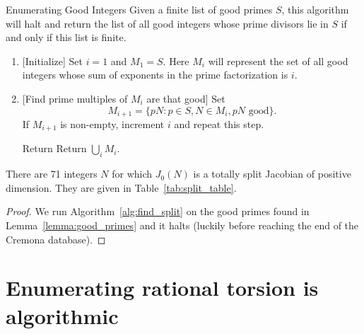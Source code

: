 \documentclass[11pt, proquest]{uwthesis}
\begin{document}
\begin{algorithm}{Enumerating Good Integers}
    \label{alg:find_split}
    Given a finite list of good primes $S$, this algorithm will halt and
    return the list of all good integers whose prime divisors lie in $S$
    if and only if this list is finite.
\end{algorithm}
\begin{enumerate}
    \item{} [Initialize] 
        Set $i=1$ and $M_1=S$. Here $M_i$ will represent the set of all good
        integers whose sum of exponents in the prime factorization is $i$.
    \item{} [Find prime multiples of $M_i$ are that good]
        Set
        \[
            M_{i+1}=\{pN: p\in S, N\in M_i, pN \text{ good}\}.
        \]
        If $M_{i+1}$ is non-empty, increment $i$ and repeat this step.
    \item [Return] 
        Return $\bigcup_i M_i$.
\end{enumerate}

\begin{theorem}
    There are 71 integers $N$ for which $J_0(N)$ is a totally split Jacobian of
    positive dimension. They are given in Table~\ref{tab:split_table}.
\end{theorem}
\begin{proof}
    We run Algorithm~\ref{alg:find_split} on the good primes found in
    Lemma~\ref{lemma:good_primes} and it halts (luckily before reaching the end
    of the Cremona database).
\end{proof}


\section{Enumerating rational torsion is algorithmic}
\end{document}
